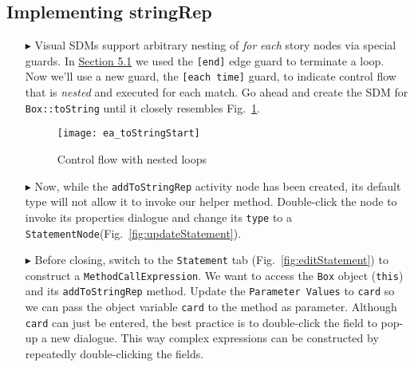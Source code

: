 \newpage
\hypertarget{stringRep vis}{}
\subsection{Implementing stringRep}
\visHeader

\begin{itemize}

\item[$\blacktriangleright$] Visual SDMs support arbitrary nesting of \emph{for each} story nodes via special guards. In \hyperlink{emptyPartition vis}{Section
5.1} we used the \texttt{[end]} edge guard to terminate a loop. Now we'll use a new guard, the \texttt{[each time]} guard, to indicate control flow that is \emph{nested} and
executed for each match. Go ahead and create the SDM for \texttt{Box::toString} until it closely resembles Fig.~\ref{fig:sdm_tostring_1}. 

\vspace{0.5cm}

\begin{figure}[htbp]
\begin{center}
  \texttt{[image: ea\_toStringStart]}
  \caption{Control flow with nested loops} 
  \label{fig:sdm_tostring_1}
\end{center}
\end{figure}

\clearpage

\item[$\blacktriangleright$] Now, while the \texttt{addToStringRep} activity node has been created, its default type will not allow it to invoke our helper
method. Double-click the node to invoke its properties dialogue and change its \texttt{type} to a \texttt{StatementNode}(Fig.~\ref{fig:updateStatement}). 

\vspace{0.5cm}

\item[$\blacktriangleright$] Before closing, switch to the \texttt{Statement} tab (Fig.~\ref{fig:editStatement}) to construct a \texttt{MethodCallExpression}.
We want to access the \texttt{Box} object (\texttt{this}) and its \texttt{addToStringRep} method. Update the \texttt{Parameter Values} to \texttt{card} so we
can pass the object variable \texttt{card} to the method as parameter. Although \texttt{card} can just be entered, the best practice is to double-click the
field to pop-up a new dialogue. This way complex expressions can be constructed by repeatedly double-clicking the fields.

\vspace{0.5cm}

\begin{figure}[htbp]
   \centering
      \caption{}
\end{figure}
\FloatBarrier

\end{itemize}

